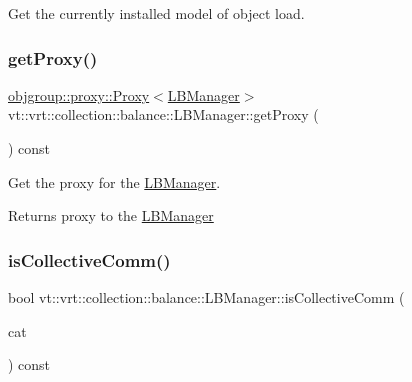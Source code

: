 Get the currently installed model of object load. 

\mbox{\label{structvt_1_1vrt_1_1collection_1_1balance_1_1_l_b_manager_aa0fbba6d90873e5fa6e40767efcabb5c}} 
\subsubsection{\texorpdfstring{get\+Proxy()}{getProxy()}}
{\footnotesize\ttfamily \hyperlink{structvt_1_1objgroup_1_1proxy_1_1_proxy}{objgroup\+::proxy\+::\+Proxy}$<$\hyperlink{structvt_1_1vrt_1_1collection_1_1balance_1_1_l_b_manager}{L\+B\+Manager}$>$ vt\+::vrt\+::collection\+::balance\+::\+L\+B\+Manager\+::get\+Proxy (\begin{DoxyParamCaption}{ }\end{DoxyParamCaption}) const\hspace{0.3cm}{\ttfamily [inline]}}



Get the proxy for the \hyperlink{structvt_1_1vrt_1_1collection_1_1balance_1_1_l_b_manager}{L\+B\+Manager}. 

\begin{DoxyReturn}{Returns}
proxy to the {\ttfamily \hyperlink{structvt_1_1vrt_1_1collection_1_1balance_1_1_l_b_manager}{L\+B\+Manager}} 
\end{DoxyReturn}
\mbox{\label{structvt_1_1vrt_1_1collection_1_1balance_1_1_l_b_manager_acf0c8a9a18f038e2c5c5ae9c7e17615e}} 
\subsubsection{\texorpdfstring{is\+Collective\+Comm()}{isCollectiveComm()}}
{\footnotesize\ttfamily bool vt\+::vrt\+::collection\+::balance\+::\+L\+B\+Manager\+::is\+Collective\+Comm (\begin{DoxyParamCaption}\item[{\hyperlink{namespacevt_1_1elm_ab7367fdbe88bdcf329563642147f9ae2}{elm\+::\+Comm\+Category}}]{cat }\end{DoxyParamCaption}) const\hspace{0.3cm}{\ttfamily [private]}}

